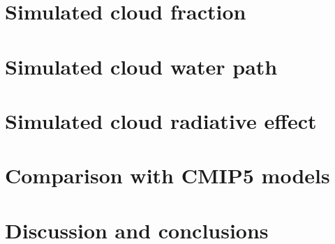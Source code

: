 \section{Simulated cloud fraction}

\section{Simulated cloud water path}

\section{Simulated cloud radiative effect}

\section{Comparison with CMIP5 models}

\section{Discussion and conclusions}

